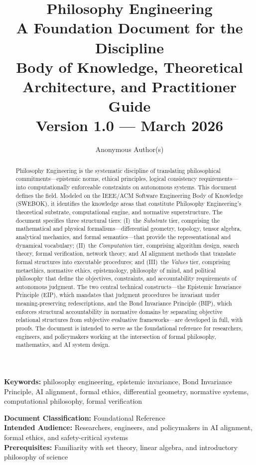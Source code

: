 \documentclass[12pt,letterpaper]{article}
\title{%
\vspace{-1cm}
{\LARGE\textbf{Philosophy Engineering}}\\[0.8em]
{\Large A Foundation Document for the Discipline}\\[0.5em]
{\large Body of Knowledge, Theoretical Architecture, and Practitioner Guide}\\[1em]
{\normalsize Version 1.0 --- March 2026}
}
\author{Anonymous Author(s)}
\date{}
\theoremstyle{definition}
\theoremstyle{plain}
\begin{document}
\maketitle
\thispagestyle{empty}

\begin{abstract}
Philosophy Engineering is the systematic discipline of translating philosophical commitments---epistemic norms, ethical principles, logical consistency requirements---into computationally enforceable constraints on autonomous systems. This document defines the field. Modeled on the IEEE/ACM Software Engineering Body of Knowledge (SWEBOK), it identifies the knowledge areas that constitute Philosophy Engineering's theoretical substrate, computational engine, and normative superstructure. The document specifies three structural tiers: (I)~the \emph{Substrate} tier, comprising the mathematical and physical formalisms---differential geometry, topology, tensor algebra, analytical mechanics, and formal semantics---that provide the representational and dynamical vocabulary; (II)~the \emph{Computation} tier, comprising algorithm design, search theory, formal verification, network theory, and AI alignment methods that translate formal structures into executable procedures; and (III)~the \emph{Values} tier, comprising metaethics, normative ethics, epistemology, philosophy of mind, and political philosophy that define the objectives, constraints, and accountability requirements of autonomous judgment. The two central technical constructs---the Epistemic Invariance Principle (EIP), which mandates that judgment procedures be invariant under meaning-preserving redescriptions, and the Bond Invariance Principle (BIP), which enforces structural accountability in normative domains by separating objective relational structures from subjective evaluative frameworks---are developed in full, with proofs. The document is intended to serve as the foundational reference for researchers, engineers, and policymakers working at the intersection of formal philosophy, mathematics, and AI system design.
\end{abstract}

\noindent\textbf{Keywords:} philosophy engineering, epistemic invariance, Bond Invariance Principle, AI alignment, formal ethics, differential geometry, normative systems, computational philosophy, formal verification

\vfill
\noindent\textbf{Document Classification:} Foundational Reference\\
\textbf{Intended Audience:} Researchers, engineers, and policymakers in AI alignment, formal ethics, and safety-critical systems\\
\textbf{Prerequisites:} Familiarity with set theory, linear algebra, and introductory philosophy of science
\end{document}
